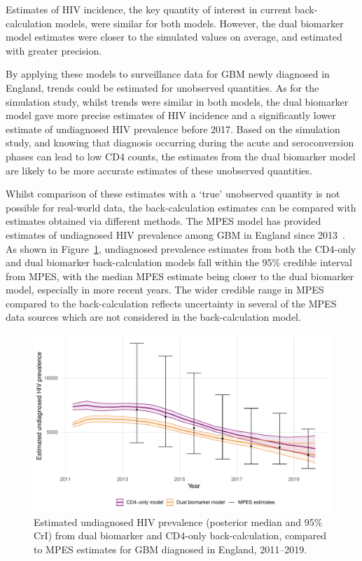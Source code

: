 Estimates of HIV incidence, the key quantity of interest in current back-calculation models, were similar for both models. However, the dual biomarker model estimates were closer to the simulated values on average, and estimated with greater precision.

By applying these models to surveillance data for GBM newly diagnosed in England, trends could be estimated for unobserved quantities. As for the simulation study, whilst trends were similar in both models, the dual biomarker model gave more precise estimates of HIV incidence and a significantly lower estimate of undiagnosed HIV prevalence before 2017. Based on the simulation study, and knowing that diagnosis occurring during the acute and seroconversion phases can lead to low CD4 counts, the estimates from the dual biomarker model are likely to be more accurate estimates of these unobserved quantities.

Whilst comparison of these estimates with a `true' unobserved quantity is not possible for real-world data, the back-calculation estimates can be compared with estimates obtained via different methods. The MPES model has provided estimates of undiagnosed HIV prevalence among GBM in England since 2013~\parencite{Presanis2021-pv}. As shown in Figure~\ref{fig:undiag_prev_mpes}, undiagnosed prevalence estimates from both the CD4-only and dual biomarker back-calculation models fall within the 95\% credible interval from MPES, with the median MPES estimate being closer to the dual biomarker model, especially in more recent years. The wider credible range in MPES compared to the back-calculation reflects uncertainty in several of the MPES data sources which are not considered in the back-calculation model.

\begin{figure}[htbp!]
  \centering
  \includegraphics[width=\textwidth]{undiag_prev_mpes.pdf}
  \caption[Estimated undiagnosed HIV prevalence (posterior median and 95\% CrI) from dual biomarker and CD4-only back-calculation, compared to MPES estimates for GBM diagnosed in England, 2011--2019]{Estimated undiagnosed HIV prevalence (posterior median and 95\% CrI) from dual biomarker and CD4-only back-calculation, compared to MPES estimates for GBM diagnosed in England, 2011--2019.}\label{fig:undiag_prev_mpes}
\end{figure}

